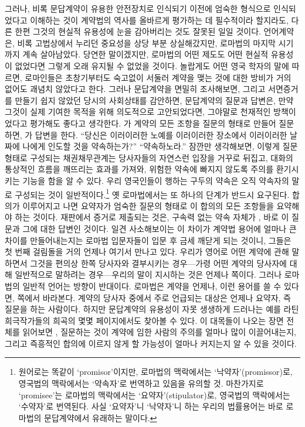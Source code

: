 그러나,
비록 문답계약이 유용한 안전장치로 인식되기 이전에
엄숙한 형식으로 인식되었다고 이해하는 것이
계약법의 역사를 올바르게 평가하는 데 필수적이라 할지라도,
다른 한편
그것의 현실적 유용성에 눈을 감아버리는 것도
잘못된 일일 것이다.
언어계약은, 비록 고법상에서 누리던 중요성을
상당 부분 상실해갔지만, 로마법의 마지막 시기까지 계속 살아남았다.
당연한 말이겠지만,
로마법의 어떤 제도도
어떤 현실적 유용성이 없었다면
그렇게 오래 유지될 수 없었을 것이다.
놀랍게도
어떤 영국 학자의 말에 따르면,
로마인들은
초창기부터도
숙고없이 서둘러 계약을 맺는 것에 대한 방비가 거의 없어도
괘념치 않았다고 한다.
그러나 문답계약을 면밀히 조사해보면,
그리고 서면증거를 만들기 쉽지 않았던 당시의 사회상태를 감안하면,
문답계약의 질문과 답변은,
만약 그것이 실제 기여한 목적을 위해 의도적으로 고안되었다면,
그야말로 천재적인 방책이었다고 평가해도 좋다고 생각한다.
가
계약의 모든 조항을 질문의 형태로 만들어 질문하면,
가 답변을 한다.
``당신은 이러이러한 노예를 이러이러한 장소에서 이러이러한 날짜에
나에게 인도할 것을 약속하는가?''
``약속하노라.''
잠깐만 생각해보면,
이렇게 질문 형태로 구성되는 채권채무관계는
당사자들의 자연스런 입장을 거꾸로 뒤집고,
대화의 통상적인 흐름을 깨뜨리는 효과를 가져와,
위험한 약속에 빠지지 않도록 주의를 환기시키는 기능을 함을 알 수 있다.
우리 영국인들이 행하는 구두의 약속은
오직 약속자의 말로 구성되는 것이 일반적이다.\footnote{%
  원어로는 똑같이 `promisor'이지만,
  로마법의 맥락에서는 `낙약자'(promissor)로,
  영국법의 맥락에서는 `약속자'로 번역하고 있음을 유의할 것.
  마찬가지로 `promisee'는 로마법의 맥락에서는 `요약자'(stipulator)로,
  영국법의 맥락에서는 `수약자'로 번역된다.
  사실 `요약자'니 `낙약자'니 하는 우리의 법률용어는
  바로 로마법의 문답계약에서 유래하는 말이다.
  }
옛 로마법에서는 또 하나의 단계가 반드시 요구된다.
합의가 이루어지고 나면
요약자가 엄숙한 질문의 형태로 이 합의의 모든 조항들을 요약해야 하는 것이다.
재판에서 증거로 제출되는 것은,
구속력 없는 약속 자체가 ,
바로 이 질문과 그에 대한 답변인 것이다.
일견 사소해보이는 이 차이가
계약법 용어에 얼마나 큰 차이를 만들어내는지는
로마법 입문자들이 입문 후 금세 깨닫게 되는 것이니,
그들은 첫 번째 걸림돌을 거의 언제나 여기서 만나고 있다.
우리가 영어로 어떤 계약에 관해 말하면서
그것을 편의상 한쪽 당사자와 결부시키는 경우---가령
어떤 계약의 당사자에 대해 일반적으로 말하려는 경우---우리의
말이 지시하는 것은 언제나
 쪽이다.
그러나 로마법의 일반적 언어는 방향이 반대이다.
로마법은 계약을 언제나, 이런 용어를 쓸 수 있다면,
 쪽에서 바라본다.
계약의 당사자 중에서
주로 언급되는 대상은 언제나 요약자, 즉
질문을 하는 사람이다.
하지만
문답계약의 유용성이 자못 생생하게 드러나는 예를
라틴 희극작가들의 희곡의 몇몇 페이지에서도 찾아볼 수 있다.
이 대목들이 나오는 장면 전체를 읽어보면
,
질문하는 것이 계약에 임한 사람의 주의를 얼마나 많이 이끌어내는지,
그리고
즉흥적인 합의에 이르지 않게 할 가능성이 얼마나 커지는지
알 수 있을 것이다.

